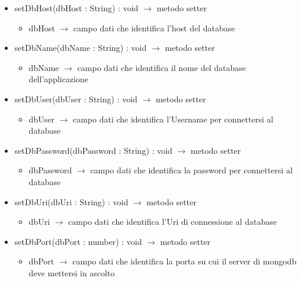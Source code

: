\begin{description}
\begin{itemize}
	\item setDbHost(dbHost : String) : void $\rightarrow$ metodo setter\begin{itemize}
		\item dbHost $\rightarrow$ campo dati che identifica l'host del database
	\end{itemize}
	
	\item setDbName(dbName : String) : void $\rightarrow$ metodo setter\begin{itemize}
		\item dbName $\rightarrow$ campo dati che identifica il nome del database dell'applicazione
	\end{itemize}
	
	\item setDbUser(dbUser : String) : void $\rightarrow$ metodo setter\begin{itemize}
		\item dbUser $\rightarrow$ campo dati che identifica l'Username per connettersi al database
	\end{itemize}
	
	\item setDbPassword(dbPassword : String) : void $\rightarrow$ metodo setter\begin{itemize}
		\item dbPassword $\rightarrow$ campo dati che identifica la password per connettersi al database
	\end{itemize}
	
	\item setDbUri(dbUri : String) : void $\rightarrow$ metodo setter\begin{itemize}
		\item dbUri $\rightarrow$ campo dati che identifica l'Uri di connessione al database
	\end{itemize}
	
	\item setDbPort(dbPort : number) : void $\rightarrow$ metodo setter\begin{itemize}
		\item dbPort $\rightarrow$ campo dati che identifica la porta su cui il server di mongodb deve mettersi in ascolto
	\end{itemize}
	
\end{itemize}

\end{description}

\vspace{0.5cm}
